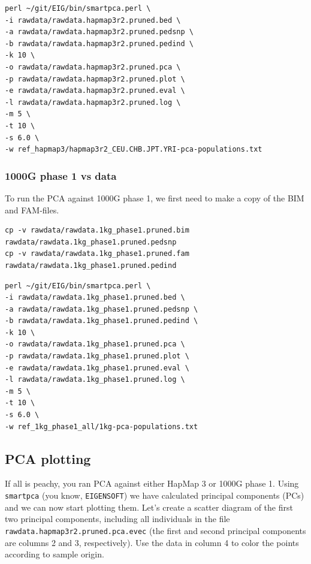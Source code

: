 \documentclass[
]{book}
\begin{document}
\begin{verbatim}
perl ~/git/EIG/bin/smartpca.perl \
-i rawdata/rawdata.hapmap3r2.pruned.bed \
-a rawdata/rawdata.hapmap3r2.pruned.pedsnp \
-b rawdata/rawdata.hapmap3r2.pruned.pedind \
-k 10 \
-o rawdata/rawdata.hapmap3r2.pruned.pca \
-p rawdata/rawdata.hapmap3r2.pruned.plot \
-e rawdata/rawdata.hapmap3r2.pruned.eval \
-l rawdata/rawdata.hapmap3r2.pruned.log \
-m 5 \
-t 10 \
-s 6.0 \
-w ref_hapmap3/hapmap3r2_CEU.CHB.JPT.YRI-pca-populations.txt
\end{verbatim}

\hypertarget{g-phase-1-vs-data}{%
\subsubsection{1000G phase 1 vs data}\label{g-phase-1-vs-data}}

To run the PCA against 1000G phase 1, we first need to make a copy of the BIM and FAM-files.

\begin{verbatim}
cp -v rawdata/rawdata.1kg_phase1.pruned.bim rawdata/rawdata.1kg_phase1.pruned.pedsnp
cp -v rawdata/rawdata.1kg_phase1.pruned.fam rawdata/rawdata.1kg_phase1.pruned.pedind
\end{verbatim}

\begin{verbatim}
perl ~/git/EIG/bin/smartpca.perl \
-i rawdata/rawdata.1kg_phase1.pruned.bed \
-a rawdata/rawdata.1kg_phase1.pruned.pedsnp \
-b rawdata/rawdata.1kg_phase1.pruned.pedind \
-k 10 \
-o rawdata/rawdata.1kg_phase1.pruned.pca \
-p rawdata/rawdata.1kg_phase1.pruned.plot \
-e rawdata/rawdata.1kg_phase1.pruned.eval \
-l rawdata/rawdata.1kg_phase1.pruned.log \
-m 5 \
-t 10 \
-s 6.0 \
-w ref_1kg_phase1_all/1kg-pca-populations.txt
\end{verbatim}

\hypertarget{pca-plotting}{%
\subsection{PCA plotting}\label{pca-plotting}}

If all is peachy, you ran PCA against either HapMap 3 or 1000G phase 1. Using \texttt{smartpca} (you know, \texttt{EIGENSOFT}) we have calculated principal components (PCs) and we can now start plotting them. Let's create a scatter diagram of the first two principal components, including all individuals in the file \texttt{rawdata.hapmap3r2.pruned.pca.evec} (the first and second principal components are columns 2 and 3, respectively). Use the data in column 4 to color the points according to sample origin.
\end{document}
